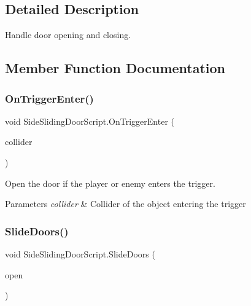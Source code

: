 \subsection{Detailed Description}
Handle door opening and closing. 

\subsection{Member Function Documentation}
\mbox{\label{class_side_sliding_door_script_aebba10c4809594041c7095c9e73a68e0}} 
\subsubsection{\texorpdfstring{OnTriggerEnter()}{OnTriggerEnter()}}
{\footnotesize\ttfamily void Side\+Sliding\+Door\+Script.\+On\+Trigger\+Enter (\begin{DoxyParamCaption}\item[{Collider}]{collider }\end{DoxyParamCaption})\hspace{0.3cm}{\ttfamily [private]}}



Open the door if the player or enemy enters the trigger. 


\begin{DoxyParams}{Parameters}
{\em collider} & Collider of the object entering the trigger \\
\hline
\end{DoxyParams}
\mbox{\label{class_side_sliding_door_script_a9817dc2084b774cf5c85e93c28868123}} 
\subsubsection{\texorpdfstring{SlideDoors()}{SlideDoors()}}
{\footnotesize\ttfamily void Side\+Sliding\+Door\+Script.\+Slide\+Doors (\begin{DoxyParamCaption}\item[{bool}]{open }\end{DoxyParamCaption})\hspace{0.3cm}{\ttfamily [private]}}



